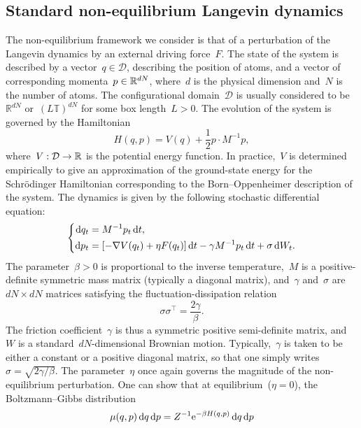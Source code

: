 \subsection{Standard non-equilibrium Langevin dynamics}\label{04:subsec:langevin_nemd}
The non-equilibrium framework we consider is that of a perturbation of the Langevin dynamics by an external driving force~$F$. 
The state of the system is described by a vector~$q\in \mathcal D$, describing the position of atoms, and a vector of corresponding momenta~$p\in \mathbb{R}^{dN}$, where~$d$ is the physical dimension and~$N$ is the number of atoms.
The configurational domain~$\mathcal D$ is usually considered to be~$\mathbb{R}^{dN}$ or~$(L\mathbb{T})^{dN}$ for some box length~$L>0$. The evolution of the system is governed by the Hamiltonian \[H(q,p) = V(q) +\frac12 p\cdot M^{-1}p,\]
where~$V:\mathcal D \to \mathbb{R}$ is the potential energy function. In practice,~$V$ is determined empirically to give an approximation of the ground-state energy for the Schr\"odinger Hamiltonian corresponding to the Born--Oppenheimer description of the system.
The dynamics is given by the following stochastic differential equation:
\begin{equation}
    \label{04:eq:langevin_equation}
    \left\{\begin{aligned}
    \mathrm{d} q_t & = M^{-1}p_t\, \mathrm{d} t, \\
    \mathrm{d} p_t &= \left[ -\nabla V(q_t) + \eta F(q_t) \right]\mathrm{d} t -\gamma M^{-1}p_t\,\mathrm{d} t +\sigma\,\mathrm{d} W_t.
    \end{aligned}\right.
\end{equation}
The parameter~$\beta > 0$ is proportional to the inverse temperature,~$M$ is a positive-definite symmetric mass matrix (typically a diagonal matrix), and~$\gamma$ and~$\sigma$ are~$dN\times dN$ matrices satisfying the fluctuation-dissipation relation 
\[\sigma\sigma^\intercal=\frac{2\gamma}\beta.\]
The friction coefficient~$\gamma$ is thus a symmetric positive semi-definite matrix, and~$W$ is a standard~$dN$-dimensional Brownian motion. Typically,~$\gamma$ is taken to be either a constant or a positive diagonal matrix, so that one simply writes~$\sigma=\sqrt{2\gamma/\beta}$. The parameter~$\eta$ once again governs the magnitude of the non-equilibrium perturbation.
One can show that at equilibrium~($\eta = 0$), the Boltzmann--Gibbs distribution
\begin{equation}
    \label{04:eq:boltzmann_gibbs_measure}
    \mu(q,p)\,\mathrm{d} q\,\mathrm{d} p= Z^{-1}\mathrm{e}^{-\beta H(q,p)}\,\mathrm{d} q\,\mathrm{d} p
\end{equation}
